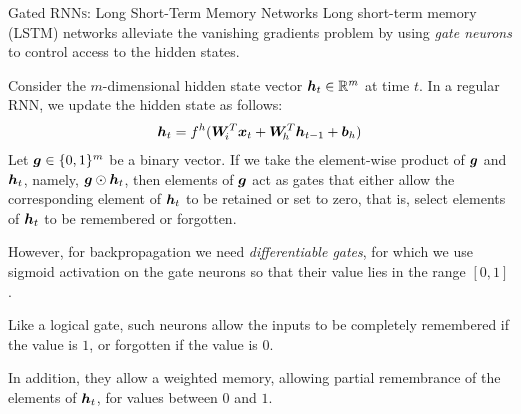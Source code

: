 %
\begin{frame}{Gated RNN\textsc{s}: Long Short-Term Memory Networks}
Long short-term memory (LSTM) networks alleviate the vanishing gradients
problem by using {\em
gate neurons} to control access to the hidden states.

\medskip

Consider the $m$-dimensional hidden state vector ${\boldsymbol h}_{t} \in {\mathord{\mathbb R}}^m$ 
at time $t$. In a regular RNN, we update the hidden state as follows: %
\begin{align*}
    {\boldsymbol h}_t = f^h({\boldsymbol W}_{\!i}^T {\boldsymbol x}_t + {\boldsymbol W}_{\!h}^T
    {\boldsymbol h}_{t-1} + {\boldsymbol b}_{h})
\end{align*}
Let ${\boldsymbol g} \in \{0,1\}^m$ be a binary vector. If we take the element-wise
product of ${\boldsymbol g}$ and ${\boldsymbol h}_t$, namely, ${\boldsymbol g} \odot {\boldsymbol h}_{t}$, 
then elements of ${\boldsymbol g}$ act as gates that 
either allow the corresponding element of ${\boldsymbol h}_t$ to be retained or set
to zero, that is, select elements of ${\boldsymbol h}_t$ to be remembered or forgotten. 

\medskip


However, for
backpropagation we need {\em differentiable gates}, for which we use
sigmoid activation on the gate neurons so that their value lies in the
range $[0,1]$. 


\medskip

Like a logical gate, such neurons allow the inputs to be
completely remembered if the value is $1$, or forgotten if the value is
$0$. 

\medskip

In addition, they allow a weighted memory, allowing partial
remembrance of the elements of ${\boldsymbol h}_t$, for values between $0$
and $1$.
\end{frame}
%
